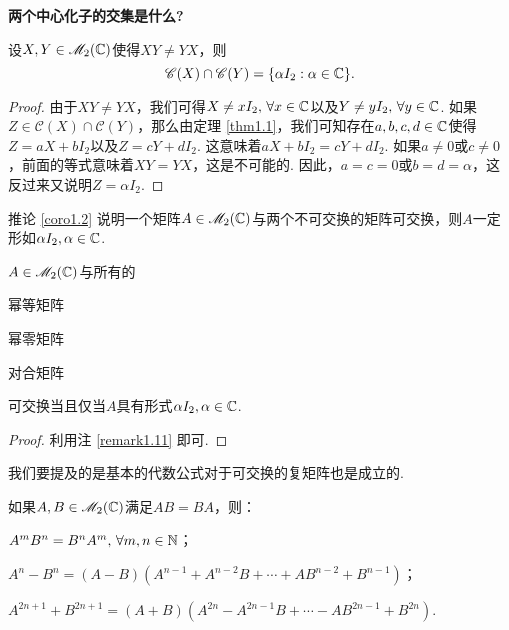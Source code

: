   \begin{mybox}
    \begin{corollary}
      {\bfseries 两个中心化子的交集是什么?}

      设$X,Y\in\mathscr M_2(\mathbb C)$使得$XY\ne YX$，则
      \[
        \mathscr C(X) \cap \mathscr C(Y) =
        \{\alpha I_2:\alpha\in\mathbb C\}.
      \]
    \end{corollary}
  \end{mybox}
  \begin{proof}
    由于$XY\ne YX$，我们可得$X\ne xI_2,\,\forall x\in \mathbb C$以及$Y\ne yI_2,\,\forall y\in\mathbb C$. 如果$Z\in\mathscr C(X)\cap\mathscr C(Y)$，那么由定理 \ref{thm1.1}，我们可知存在$a,b,c,d\in\mathbb C$使得$Z=aX+bI_2$以及$Z=cY+dI_2$. 这意味着$aX+bI_2=cY+dI_2$. 如果$a\ne0$或$c\ne0$，前面的等式意味着$XY=YX$，这是不可能的. 因此，$a=c=0$或$b=d=\alpha$，这反过来又说明$Z=\alpha I_2$.
  \end{proof}

  \begin{remark}
    推论 \ref{coro1.2} 说明一个矩阵$A\in\mathscr M_2(\mathbb C)$与两个不可交换的矩阵可交换，则$A$一定形如$\alpha I_2,\alpha\in\mathbb C$.
  \end{remark}

  \begin{corollary}
    $A\in\mathscr M_2(\mathbb C)$与所有的
    \begin{enum}
      \item 幂等矩阵
      \item 幂零矩阵
      \item 对合矩阵
    \end{enum}
    可交换当且仅当$A$具有形式$\alpha I_2,\alpha\in\mathbb C$.
  \end{corollary}
  \begin{proof}
    利用注 \ref{remark1.11} 即可.
  \end{proof}

  我们要提及的是基本的代数公式对于可交换的复矩阵也是成立的.
  \begin{property}
    如果$A,B\in\mathscr M_2(\mathbb C)$满足$AB=BA$，则：
    \begin{enum}
      \item $A^mB^n=B^nA^m,\,\forall m,n\in\mathbb N$；
      \item $A^n-B^n=(A-B)(A^{n-1}+A^{n-2}B+\cdots+AB^{n-2}
          +B^{n-1})$；
      \item $A^{2n+1}+B^{2n+1}=(A+B)(A^{2n}-A^{2n-1}B
          +\cdots-AB^{2n-1}+B^{2n})$.
    \end{enum}
  \end{property}

